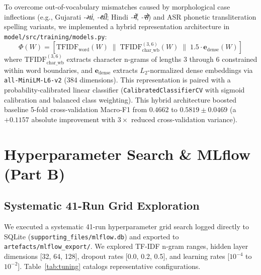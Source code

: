 \documentclass[sigconf,authordraft]{acmart}
\begin{document}
To overcome out-of-vocabulary mismatches caused by morphological case inflections (e.g., Gujarati \emph{-માં}, \emph{-થી}; Hindi \emph{-में}, \emph{-से}) and ASR phonetic transliteration spelling variants, we implemented a hybrid representation architecture in \texttt{model/src/training/models.py}:
\begin{equation}
  \Phi(W) = \left[ \text{TFIDF}_{\text{word}}(W) \;\|\; \text{TFIDF}_{\text{char\_wb}}^{(3,6)}(W) \;\|\; 1.5 \cdot \mathbf{e}_{\text{dense}}(W) \right]
  \label{eq:hybrid_feat}
\end{equation}
where $\text{TFIDF}_{\text{char\_wb}}^{(3,6)}$ extracts character n-grams of lengths 3 through 6 constrained within word boundaries, and $\mathbf{e}_{\text{dense}}$ extracts $L_2$-normalized dense embeddings via \texttt{all-MiniLM-L6-v2} (384 dimensions). This representation is paired with a probability-calibrated linear classifier (\texttt{CalibratedClassifierCV} with sigmoid calibration and balanced class weighting). This hybrid architecture boosted baseline 5-fold cross-validation Macro-F1 from $0.4662$ to \textbf{$0.5819 \pm 0.0469$} (a $+0.1157$ absolute improvement with $3\times$ reduced cross-validation variance).

\section{Hyperparameter Search & MLflow (Part B)}
\label{sec:tuning}

\subsection{Systematic 41-Run Grid Exploration}

We executed a systematic 41-run hyperparameter grid search logged directly to SQLite
(\texttt{supporting\_files/mlflow.db}) and exported to \texttt{artefacts/mlflow\_export/}.
We explored TF-IDF n-gram ranges, hidden layer dimensions [32, 64, 128], dropout rates [0.0, 0.2, 0.5],
and learning rates [$10^{-4}$ to $10^{-2}$]. Table~\ref{tab:tuning} catalogs representative configurations.
\end{document}
